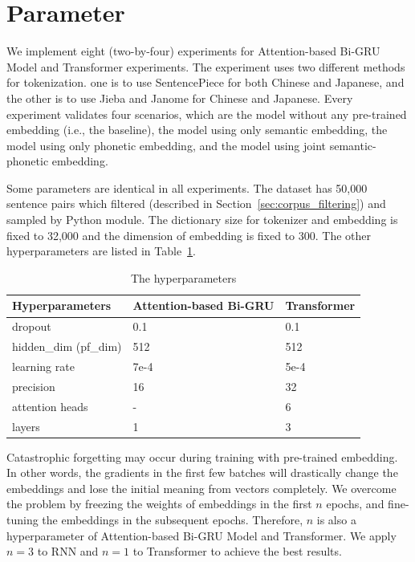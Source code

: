 \section{Parameter} \label{sec:parameter}

We implement eight (two-by-four) experiments for Attention-based Bi-GRU Model and Transformer experiments. The experiment uses two different methods for tokenization. one is to use SentencePiece for both Chinese and Japanese, and the other is to use Jieba and Janome for Chinese and Japanese. Every experiment validates four scenarios, which are the model without any pre-trained embedding (i.e., the baseline), the model using only semantic embedding, the model using only phonetic embedding, and the model using joint semantic-phonetic embedding.

Some parameters are identical in all experiments. The dataset has 50,000 sentence pairs which filtered (described in Section~\ref{sec:corpus_filtering}) and sampled by Python  module. The dictionary size for tokenizer and embedding is fixed to 32,000 and the dimension of embedding is fixed to 300. The other hyperparameters are listed in Table~\ref{tab:hyperparameters}.

\vspace{0.4cm}
\begin{table}[h]
    \centering
    \begin{tabularx}{\textwidth}{bbb}\toprule
        Hyperparameters & Attention-based Bi-GRU & Transformer \\\midrule
        dropout & 0.1 & 0.1 \\
        hidden\_dim (pf\_dim) & 512 & 512 \\
        learning rate & 7e-4 & 5e-4 \\
        precision & 16 & 32 \\
        attention heads & - & 6 \\
        layers & 1 & 3 \\ 
        \bottomrule
    \end{tabularx}
    \caption{The hyperparameters}
    \label{tab:hyperparameters}
\end{table}

Catastrophic forgetting \cite{kirkpatrick2017overcoming} may occur during training with pre-trained embedding. In other words, the gradients in the first few batches will drastically change the embeddings and lose the initial meaning from vectors completely. We overcome the problem by freezing the weights of embeddings in the first $n$ epochs, and fine-tuning the embeddings in the subsequent epochs. Therefore, $n$ is also a hyperparameter of Attention-based Bi-GRU Model and Transformer. We apply $n=3$ to RNN and $n=1$ to Transformer to achieve the best results.


